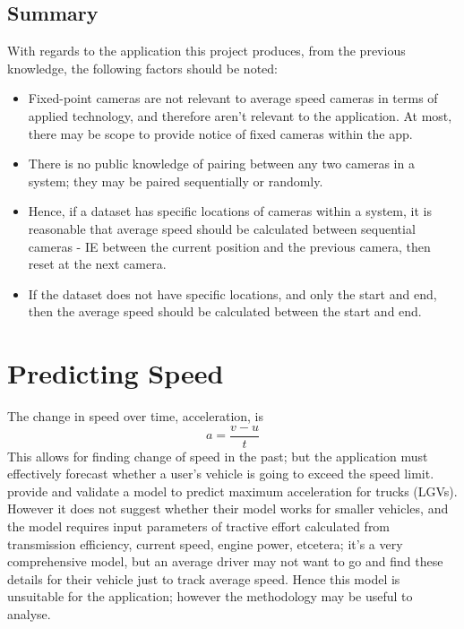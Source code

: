 \documentclass[11pt, a4paper, notitlepage]{report}
\begin{document}
\subsection{Summary}
With regards to the application this project produces, from the previous knowledge, the following factors should be noted:
\begin{itemize}
    \item Fixed-point cameras are not relevant to average speed cameras in terms of applied technology, and therefore aren't relevant to the application. At most, there may be scope to provide notice of fixed cameras within the app.
    \item There is no public knowledge of pairing between any two cameras in a system; they may be paired sequentially or randomly.
    \item Hence, if a dataset has specific locations of cameras within a system, it is reasonable that average speed should be calculated between sequential cameras - IE between the current position and the previous camera, then reset at the next camera.
    \item If the dataset does not have specific locations, and only the start and end, then the average speed should be calculated between the start and end.
\end{itemize}

\section{Predicting Speed}
The change in speed over time, acceleration, is
\begin{equation}\label{eq:Accel}
    a = \frac{v - u}{t}
\end{equation}
This allows for finding change of speed in the past; but the application must effectively forecast whether a user's vehicle is going to exceed the speed limit. \citet{accelerationForecasting} provide and validate a model to predict maximum acceleration for trucks (LGVs). However it does not suggest whether their model works for smaller vehicles, and the model requires input parameters of tractive effort calculated from transmission efficiency, current speed, engine power, etcetera; it's a very comprehensive model, but an average driver may not want to go and find these details for their vehicle just to track average speed. Hence this model is unsuitable for the application; however the methodology may be useful to analyse.
\end{document}
